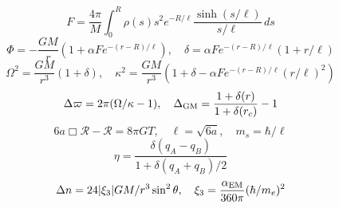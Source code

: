 \[F=\frac{4\pi}{M}\int_0^R\rho(s)s^2 e^{-R/\ell}\frac{\sinh(s/\ell)}{s/\ell}\,ds\]
\[\Phi=-\frac{GM}{r}(1+\alpha F e^{-(r-R)/\ell}),\quad \delta=\alpha F e^{-(r-R)/\ell}(1+r/\ell)\]
\[\Omega^2=\frac{GM}{r^3}(1+\delta),\quad \kappa^2=\frac{GM}{r^3}(1+\delta-\alpha F e^{-(r-R)/\ell}(r/\ell)^2)\]
\[\Delta\varpi=2\pi(\Omega/\kappa-1),\quad \Delta_{\rm GM}=\frac{1+\delta(r)}{1+\delta(r_c)}-1\]
\[6a\Box\mathcal R-\mathcal R=8\pi GT,\quad \ell=\sqrt{6a},\quad m_s=\hbar/\ell\]
\[\eta=\frac{\delta(q_A-q_B)}{1+\delta(q_A+q_B)/2}\]
\[\Delta n=24|\xi_3|GM/r^3\sin^2\theta,\quad \xi_3=\frac{\alpha_{\rm EM}}{360\pi}(\hbar/m_e)^2\]
